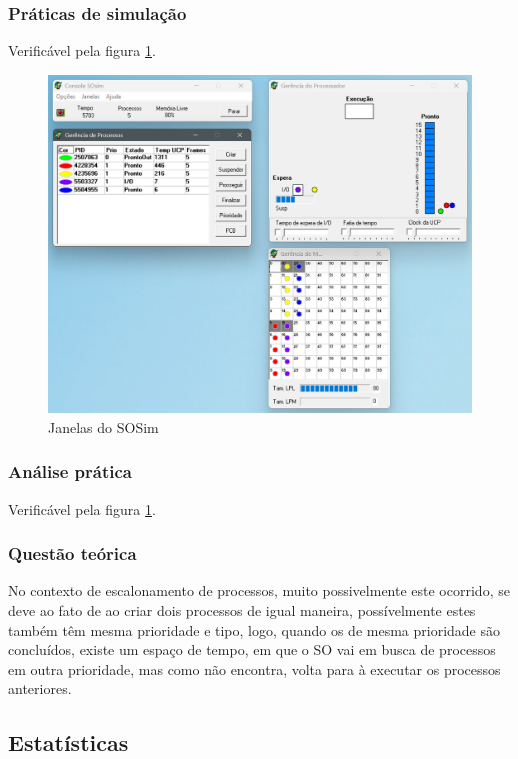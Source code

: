 \documentclass[a4paper,12pt]{article} %
\begin{document}
\subsubsection[]{Práticas de simulação}
Verificável pela figura \ref{fig5}.
\begin{figure}[htbp]
    \centering
    \includegraphics[scale=0.4]{../fig/fig5.png}
    \caption{Janelas do SOSim}
    \label{fig5}
\end{figure}
\subsubsection[]{Análise prática}
Verificável pela figura \ref{fig5}.
\subsubsection[]{Questão teórica}
No contexto de escalonamento de processos, muito possivelmente este ocorrido, se deve ao fato de ao criar dois processos
de igual maneira, possívelmente estes também têm mesma prioridade e tipo, logo, quando os de mesma prioridade são concluídos,
existe um espaço de tempo, em que o SO vai em busca de processos em outra prioridade, mas como não encontra, volta para à
executar os processos anteriores.
\subsection[]{Estatísticas}
\end{document}
